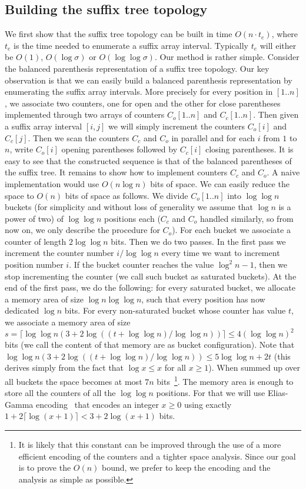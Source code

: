 \documentclass[a4paper]{article}
\begin{document}
\subsection{Building the suffix tree topology}
We first show that the suffix tree topology can be built in time $O(n\cdot t_e)$, where $t_e$ is the time needed to enumerate a suffix array interval. Typically $t_e$ will either be $O(1)$, $O(\log\sigma)$ or $O(\log\log\sigma)$. 
Our method is rather simple. Consider the balanced parenthesis representation of a suffix tree topology. Our key observation is that we can easily build a balanced parenthesis representation by enumerating the suffix array intervals. More precisely for every position in $[1..n]$, we associate two counters, one for open and the other for close parentheses implemented through two arrays of counters $C_o[1..n]$ and $C_c[1..n]$. Then given a suffix array interval $[i,j]$ we will simply increment the counters $C_o[i]$ and $C_c[j]$. Then we scan the counters $C_c$ and $C_o$ in parallel and for each $i$ from $1$ to $n$, write $C_o[i]$ opening parentheses followed by $C_c[i]$ closing parentheses. It is easy to see that the constructed sequence is that of the balanced parentheses of the suffix tree. 
It remains to show how to implement counters $C_c$ and $C_o$. A naive implementation would use $O(n\log n)$ bits of space. 
We can easily reduce the space to $O(n)$ bits of space as follows. We divide $C_o[1..n]$ into $\log\log n$ buckets (for simplicity and without loss of generality we assume that $\log n$ is a power of two) of $\log\log n$ positions each ($C_c$ and $C_o$ handled similarly, so from now on, we only describe the procedure for $C_o$). For each bucket we associate a counter of length $2\log\log n$ bits. Then we do two passes. In the first pass we increment the counter number $i/\log\log n$ every time we want to increment position number $i$. If the bucket counter reaches the value $\log^2n-1$, then we stop incrementing the counter (we call such bucket as saturated buckets). At the end of the first pass, we do the following: for every saturated bucket, we allocate a memory area of size $\log n\log \log n$, such that every position has now dedicated $\log n$ bits. For every non-saturated bucket whose counter has value $t$, we associate a memory area of size $s=\lceil \log\log n(3+2\log((t+\log\log n)/\log\log n))\rceil\leq 4(\log\log n)^2$ bits (we call the content of that memory are as bucket configuration). Note that $\log\log n(3+2\log((t+\log\log n)/\log\log n))\leq 5\log\log n+2t$ (this derives simply from the fact that $\log x\leq x$ for all $x\geq 1$). When summed up over all buckets the space becomes at most $7n$ bits~\footnote{It is likely that this constant can be improved through the use of a more efficient encoding of the counters and a tighter space analysis. Since our goal is to prove the $O(n)$ bound, we prefer to keep the encoding and the analysis as simple as possible.}. The memory area is enough to store all the counters of all the $\log\log n$ positions. For that we will use Elias-Gamma encoding~\cite{El75} that encodes an integer $x\geq 0$ using exactly $1+2\lceil\log (x+1)\rceil<3+2\log (x+1)$ bits. 
\end{document}
